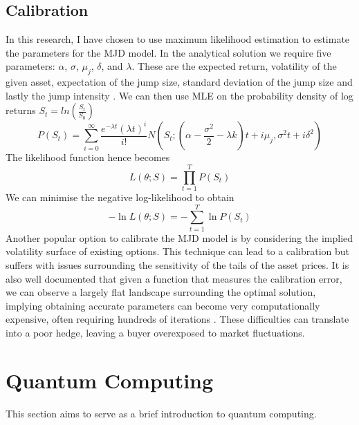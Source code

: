 \documentclass[12pt]{article}
\numberwithin{equation}{section}
\begin{document}
\subsection{Calibration}
In this research, I have chosen to use maximum likelihood estimation to estimate 
the parameters for the MJD model. In the analytical solution we require five 
parameters: $\alpha$, $\sigma$, $\mu_j$, $\delta$, and $\lambda$. These are the 
expected return, volatility of the given asset, expectation of the jump size, 
standard deviation of the jump size and lastly the jump intensity
\autocite{calibration1,mlecalibration,paramcalibration}. 
We can then 
use MLE on the probability density of log returns $S_t = ln(\frac{S_t}{S_0})$ 
\begin{equation}
P(S_t) = \sum^\infty_{i=0} \frac{e^{-\lambda t}(\lambda t)^i}{i!}N(S_t;(\alpha - 
\frac{\sigma^2}{2}-\lambda k)t+i\mu_j,\sigma^2t+i\delta^2)
\end{equation}
The likelihood function hence becomes 
\begin{equation}
  L(\theta;S) = \prod^T_{t=1}P(S_t)
\end{equation}
We can minimise the negative log-likelihood to obtain 
\begin{equation}
  -\ln L(\theta;S) = -\sum^T_{t=1}\ln P(S_t)
\end{equation}
Another popular option to calibrate the MJD model is by considering the implied 
volatility surface of existing options. This technique can lead to a 
calibration but suffers with issues surrounding the sensitivity of the tails of 
the asset prices. It is also well documented that given a function that measures 
the calibration error, we can observe a largely flat landscape surrounding the 
optimal solution, 
implying obtaining accurate parameters can become very computationally 
expensive, often requiring hundreds of iterations \autocite{calibration1}. These difficulties
can translate into a poor hedge, leaving a buyer overexposed to market fluctuations. 

\clearpage


\section{Quantum Computing}
This section aims to serve as a brief introduction to quantum computing. 
\end{document}
